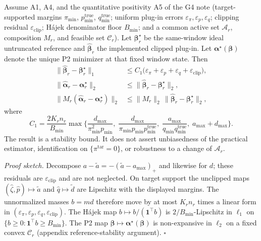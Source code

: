 
\begin{proposition}
\label{prop:practical_plugin}
Assume A1, A4, and the quantitative positivity A5 of the G4 note
(target-supported margins $\pi_{\min}$, $p_{\min}^{\mathrm{true}}$,
$q_{\min}^{\mathrm{true}}$; uniform plug-in errors
$\varepsilon_\pi,\varepsilon_p,\varepsilon_q$; clipping residual
$\varepsilon_{\mathrm{clip}}$; H\'ajek denominator floor $B_{\min}$;
and a common active set $\mathcal A_r$, composition $M_r$, and feasible
set $\mathcal C_r$).
Let $\boldsymbol\beta_r^\star$ be the same-window ideal untruncated
reference and $\widehat{\boldsymbol\beta}_r$ the implemented clipped
plug-in.  Let $\boldsymbol\alpha^\star(\boldsymbol\beta)$ denote the unique
P2 minimizer at that fixed window state.  Then
\begin{align}
\bigl\|\widehat{\boldsymbol\beta}_r-\boldsymbol\beta_r^\star\bigr\|_1
&\le
C_1\bigl(\varepsilon_\pi+\varepsilon_p+\varepsilon_q+\varepsilon_{\mathrm{clip}}\bigr),
\label{eq:g4_beta}\\
\bigl\|\widehat{\boldsymbol\alpha}_r-\boldsymbol\alpha_r^\star\bigr\|_2
&\le
\bigl\|\widehat{\boldsymbol\beta}_r-\boldsymbol\beta_r^\star\bigr\|_2,
\label{eq:g4_alpha}\\
\bigl\|M_r(\widehat{\boldsymbol\alpha}_r-\boldsymbol\alpha_r^\star)\bigr\|_2
&\le
\|M_r\|_2\,
\bigl\|\widehat{\boldsymbol\beta}_r-\boldsymbol\beta_r^\star\bigr\|_2,
\label{eq:g4_comp}
\end{align}
where
\begin{equation}
C_1
=
\frac{2K_r n_r}{B_{\min}}
\max\Biggl\{
\frac{d_{\max}}{\pi_{\min}^2 p_{\min}},\;
\frac{d_{\max}}{\pi_{\min}p_{\min}p_{\min}^{\mathrm{true}}},\;
\frac{a_{\max}}{q_{\min}q_{\min}^{\mathrm{true}}},\;
a_{\max}+d_{\max}
\Biggr\}.
\label{eq:g4_c1}
\end{equation}
The result is a stability bound.  It does not assert unbiasedness of the
practical estimator, identification on $\{\pi^{\mathrm{tar}}=0\}$, or
robustness to a change of $\mathcal A_r$.
\end{proposition}

\noindent\emph{Proof sketch.}
Decompose $a-\widetilde a= -(\widetilde a-a_{\max})_+$ and likewise for
$d$; these residuals are $\varepsilon_{\mathrm{clip}}$ and are not
neglected.  On target support the unclipped maps
$(\widehat\zeta,\widehat p)\mapsto\widetilde a$ and
$\widehat q\mapsto\widetilde d$ are Lipschitz with the displayed
margins.  The unnormalized masses $b=md$ therefore move by at most
$K_r n_r$ times a linear form in
$(\varepsilon_\pi,\varepsilon_p,\varepsilon_q,\varepsilon_{\mathrm{clip}})$.
The H\'ajek map $b\mapsto b/(\mathbf 1^\top b)$ is $2/B_{\min}$-Lipschitz
in $\ell_1$ on $\{b\ge0:\mathbf 1^\top b\ge B_{\min}\}$.
The P2 map $\boldsymbol\beta\mapsto\boldsymbol\alpha^\star(\boldsymbol\beta)$
is non-expansive in $\ell_2$ on a fixed convex $\mathcal C_r$
(appendix reference-stability argument).
\hfill$\square$
